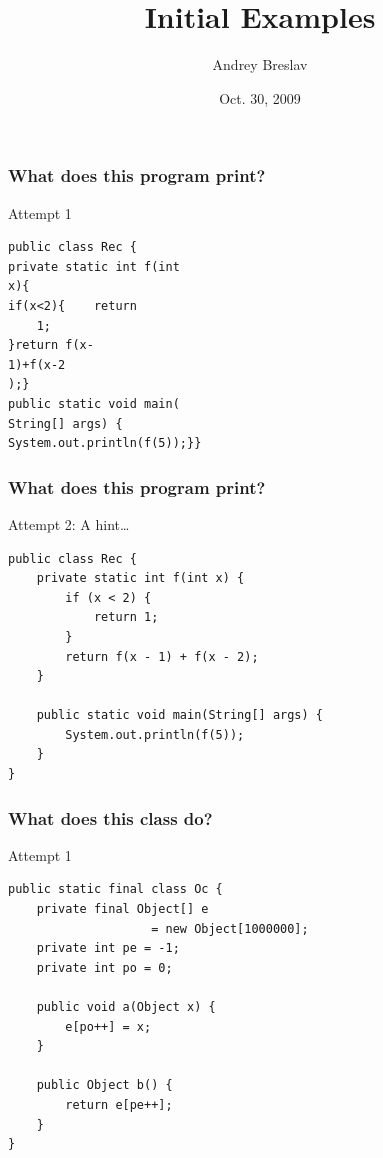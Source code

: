 \documentclass[screen]{beamer}
\title{Initial Examples}
\author{Andrey Breslav}
\institute{ITMO University, St. Petersburg / University of Tartu}
\date{Oct. 30, 2009}
\begin{document}

\begin{frame}[t,fragile]
\frametitle{What does this program print?}%
\begin{block}{Attempt 1}
\begin{lstlisting}
public class Rec {
private static int f(int 
x){
if(x<2){    return 
	1;
}return f(x- 
1)+f(x-2
);}
public static void main(
String[] args) {
System.out.println(f(5));}}
\end{lstlisting}%
\end{block}
\end{frame}

\begin{frame}[t,fragile]
\frametitle{What does this program print?}%
%
\begin{block}{Attempt 2: A hint\ldots}%
\begin{lstlisting}
public class Rec {
    private static int f(int x) {
		if (x < 2) {
			return 1;
		}
		return f(x - 1) + f(x - 2);
	}

	public static void main(String[] args) {
		System.out.println(f(5));
	}
}
\end{lstlisting}%
\end{block}%
\end{frame}

\begin{frame}[c,fragile]
\frametitle{What does this class do?}%
%
\begin{block}{Attempt 1}%
\begin{lstlisting}
public static final class Oc {
	private final Object[] e 
					= new Object[1000000];
	private int pe = -1;
	private int po = 0;

	public void a(Object x) {
		e[po++] = x;
	}

	public Object b() {
		return e[pe++];
	}
}
\end{lstlisting}%
\end{block}%

\end{frame}
\end{document}
